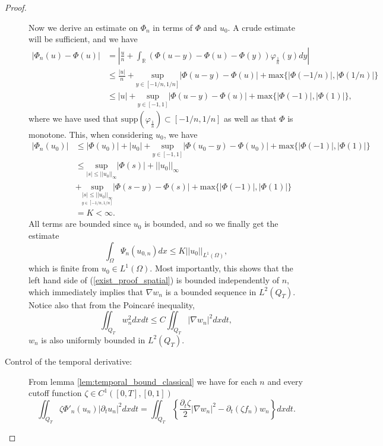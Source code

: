 \documentclass[11pt, a4paper]{article}
\begin{document}
\begin{proof}
\begin{description}
	Now we derive an estimate on $\Phi_n$ in terms of $\Phi$ and $u_0$. A crude estimate will be sufficient, and we have
	\begin{align*}
	|\Phi_n(u) - \Phi(u)| &= \left|\frac{u}{n} + \int_\mathbb{R}\left( \Phi(u-y) - \Phi(u) - \Phi(y)\right)\varphi_{\frac{1}{n}}(y)dy \right| \\
	&\leq \frac{|u|}{n} + \underset{y\in [-1/n, 1/n]}{\mathrm{sup}}|\Phi(u-y) - \Phi(u)| + \mathrm{max}\{|\Phi(-1/n)|, |\Phi(1/n)|\} \\
	&\leq |u| + \underset{y\in [-1, 1]}{\mathrm{sup}}|\Phi(u-y) - \Phi(u)| +\mathrm{max}\{|\Phi(-1)|, |\Phi(1)|\},
	\end{align*}
	where we have used that $\mathrm{supp}(\varphi_{\frac{1}{n}})\subset [-1/n, 1/n]$ as well as that $\Phi$ is monotone. This, when considering $u_0$, we have
	\begin{align*}
	|\Phi_n(u_0)| &\leq |\Phi(u_0)| + |u_0| + \underset{y\in [-1, 1]}{\mathrm{sup}}|\Phi(u_0-y) - \Phi(u_0)| +\mathrm{max}\{|\Phi(-1)|, |\Phi(1)|\} \\
	& \leq \underset{|s| \leq ||u_0||_\infty}{\mathrm{sup}}|\Phi(s)| + ||u_0||_{\infty}\\
	& + \underset{\underset{y\in[-1/n,1/n]}{|s| \leq ||u_0||_{\infty}}}{\mathrm{sup}}|\Phi(s-y) - \Phi(s)| + \mathrm{max}\{|\Phi(-1)|, |\Phi(1)|\} \\
	&= K < \infty.
	\end{align*}
	All terms are bounded since $u_0$ is bounded, and so we finally get the estimate
	\begin{equation*}
	\int_\Omega \Psi_n(u_{0,n})dx \leq K ||u_0||_{L^1(\Omega)},
	\end{equation*}
	which is finite from $u_0 \in L^1(\Omega)$. Most importantly, this shows that the left hand side of (\ref{exist_proof_spatial}) is bounded independently of $n$, which immediately implies that $\nabla w_n$ is a bounded sequence in $L^2(Q_T)$. Notice also that from the Poincaré inequality,
	\begin{equation*}
	\iint_{Q_T}w_n^2 dxdt \leq C\iint_{Q_T} |\nabla w_n|^2dxdt,	
	\end{equation*}
	$w_n$ is also uniformly bounded in $L^2(Q_T)$.
	
	\item[Control of the temporal derivative:] From lemma \ref{lem:temporal_bound_classical} we have for each $n$ and every cutoff function $\zeta\in C^1([0,T], [0,1])$
	\begin{equation}
	\iint_{Q_T} \zeta \Phi'_n(u_n) |\partial_t u_n|^2 dxdt = \iint_{Q_T} \left\{ \frac{\partial_t \zeta}{2}|\nabla w_n|^2 - \partial_t(\zeta f_n) w_n \right\} dxdt.
	\end{equation}
	

\end{description}
\end{proof}
\end{document}

